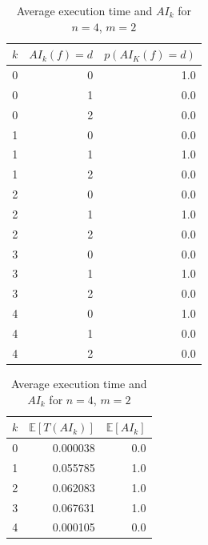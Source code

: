 \documentclass[11pt]{llncs}
\begin{document}
\begin{table}[ht]
    \centering
    \begin{minipage}{0.45\textwidth}
        \centering
       \begin{tabular}{rrr}
\toprule
 $k$ &  $AI_k(f)=d$ &  $p\left(AI_K(f) = d\right)$ \\
\midrule
   0 &            0 &                          1.0 \\
   0 &            1 &                          0.0 \\
   0 &            2 &                          0.0 \\
   \hline
   1 &            0 &                          0.0 \\
   1 &            1 &                          1.0 \\
   1 &            2 &                          0.0 \\
   \hline
   2 &            0 &                          0.0 \\
   2 &            1 &                          1.0 \\
   2 &            2 &                          0.0 \\
   \hline
   3 &            0 &                          0.0 \\
   3 &            1 &                          1.0 \\
   3 &            2 &                          0.0 \\
   \hline
   4 &            0 &                          1.0 \\
   4 &            1 &                          0.0 \\
   4 &            2 &                          0.0 \\
\bottomrule
\end{tabular}
        \caption{Probability distribution of $AI_k$ for $n=4$, $m=2$}
        \label{table:probFullDist}
    \end{minipage}\hfill
    \begin{minipage}{0.45\textwidth}
        \centering
        \begin{tabular}{rrr}
\toprule
 $k$ &  $\mathbb{E}[T(AI_k)]$ &  $\mathbb{E}[AI_k]$ \\
\midrule
   0 &               0.000038 &                 0.0 \\
   1 &               0.055785 &                 1.0 \\
   2 &               0.062083 &                 1.0 \\
   3 &               0.067631 &                 1.0 \\
   4 &               0.000105 &                 0.0 \\
\bottomrule
\end{tabular}
        \caption{Average execution time and $AI_k$ for $n=4$, $m=2$}
        \label{table:averagesFullDist}
    \end{minipage}
\end{table}
\end{document}
